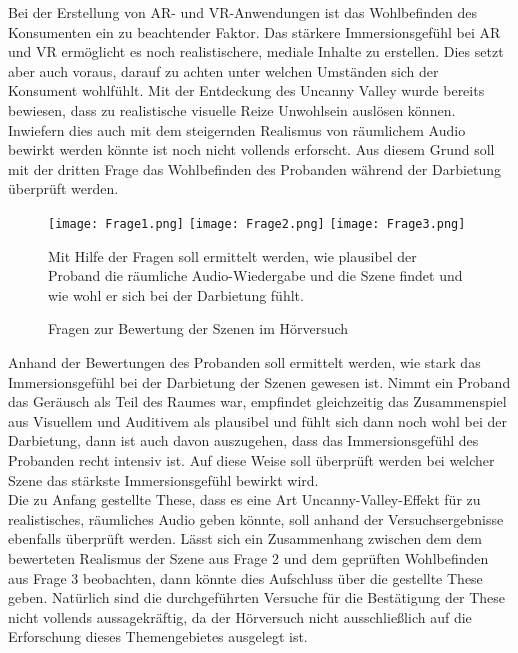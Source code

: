  \newpage
Bei der Erstellung von AR- und VR-Anwendungen ist das Wohlbefinden des Konsumenten ein zu beachtender Faktor. Das stärkere Immersionsgefühl bei AR und VR ermöglicht es noch realistischere, mediale Inhalte zu erstellen. Dies setzt aber auch voraus, darauf zu achten unter welchen Umständen sich der Konsument wohlfühlt. Mit der Entdeckung des Uncanny Valley wurde bereits bewiesen, dass zu realistische visuelle Reize Unwohlsein auslösen können. Inwiefern dies auch mit dem steigernden Realismus von räumlichem Audio bewirkt werden könnte ist noch nicht vollends erforscht. Aus diesem Grund soll mit der dritten Frage das Wohlbefinden des Probanden während der Darbietung überprüft werden. 
 
 \vspace*{20pt}
 \begin{figure}[H]
\centering
\texttt{[image: Frage1.png]}
\texttt{[image: Frage2.png]}
\texttt{[image: Frage3.png]}
\caption{Fragen zur Bewertung der Szenen im Hörversuch}
Mit Hilfe der Fragen soll ermittelt werden, wie plausibel der Proband die räumliche Audio-Wiedergabe und die Szene findet und wie wohl er sich bei der Darbietung fühlt.
\label{fig:Fragen}
\end{figure} 
 \vspace*{10pt}

Anhand der Bewertungen des Probanden soll ermittelt werden, wie stark das Immersionsgefühl bei der Darbietung der Szenen gewesen ist. Nimmt ein Proband das Geräusch als Teil des Raumes war, empfindet gleichzeitig das Zusammenspiel aus Visuellem und Auditivem als plausibel und fühlt sich dann noch wohl bei der Darbietung, dann ist auch davon auszugehen, dass das Immersionsgefühl des Probanden recht intensiv ist. Auf diese Weise soll überprüft werden bei welcher Szene das stärkste Immersionsgefühl bewirkt wird. \\ 

Die zu Anfang gestellte These, dass es eine Art Uncanny-Valley-Effekt für zu realistisches, räumliches Audio geben könnte, soll anhand der Versuchsergebnisse ebenfalls überprüft werden. Lässt sich ein Zusammenhang zwischen dem dem bewerteten Realismus der Szene aus Frage 2 und dem geprüften Wohlbefinden aus Frage 3 beobachten, dann könnte dies Aufschluss über die gestellte These geben. Natürlich sind die durchgeführten Versuche für die Bestätigung der These nicht vollends aussagekräftig, da der Hörversuch nicht ausschließlich auf die Erforschung dieses Themengebietes ausgelegt ist. 
 
